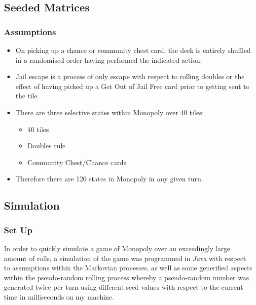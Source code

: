 \documentclass[12pt]{article}
\begin{document}
\subsection{Seeded Matrices}
\subsubsection{Assumptions}
\begin{itemize}
\item On picking up a chance or community chest card, the deck is entirely shuffled in a randomised order having performed the indicated action.
\item Jail escape is a process of only escape with respect to rolling doubles or the effect of having picked up a Get Out of Jail Free card prior to getting sent to the tile.
\item There are three selective states within Monopoly over 40 tiles:
\begin{itemize}
\item 40 tiles
\item Doubles rule
\item Community Chest/Chance cards
\end{itemize}
\item Therefore there are 120 states in Monopoly in any given turn.
\end{itemize}

\subsection{Simulation}
\subsubsection{Set Up}
In order to quickly simulate a game of Monopoly over an exceedingly large amount of rolls, a simulation of the game was programmed in \emph{Java} with respect to assumptions within the Markovian processes, as well as some generified aspects within the pseudo-random rolling process whereby a pseudo-random number was generated twice per turn using different seed values with respect to the current time in milliseconds on my machine. 
\end{document}
